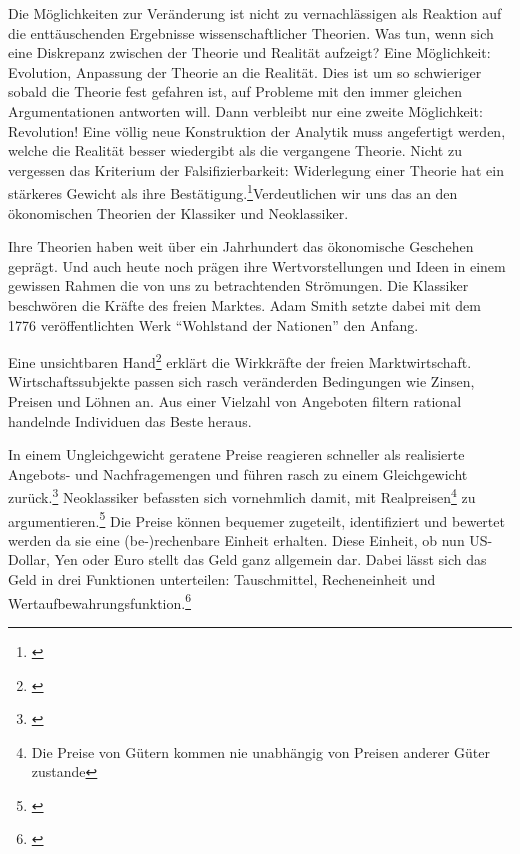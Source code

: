 \documentclass[
        onecolumn,
        a4paper,
        abstracton,
        parskip=half
        ,final
        ]{scrartcl}
\begin{document}
Die M{\"o}glichkeiten zur Ver{\"a}nderung ist nicht zu vernachl{\"a}ssigen als Reaktion auf die entt{\"a}uschenden Ergebnisse wissenschaftlicher Theorien. Was tun, wenn sich eine Diskrepanz zwischen der Theorie und Realit{\"a}t aufzeigt?
 Eine M{\"o}glichkeit: Evolution, Anpassung der Theorie an die Realit{\"a}t. Dies ist um so schwieriger sobald die Theorie fest gefahren ist, auf Probleme mit den immer gleichen Argumentationen antworten will. 
 Dann verbleibt nur eine zweite M{\"o}glichkeit: Revolution! Eine v{\"o}llig neue Konstruktion der Analytik muss angefertigt werden, welche die Realit{\"a}t besser wiedergibt als die vergangene Theorie. 
 Nicht zu vergessen das Kriterium der Falsifizierbarkeit: Widerlegung einer Theorie hat ein st{\"a}rkeres Gewicht als ihre Best{\"a}tigung.\footnote[11]{\citep*[S.161]{bombach1981theorie}}Verdeutlichen wir uns das an den {\"o}konomischen Theorien der Klassiker und Neoklassiker. 
     
Ihre Theorien haben weit {\"u}ber ein Jahrhundert das {\"o}konomische Geschehen gepr{\"a}gt. Und auch heute noch pr{\"a}gen ihre Wertvorstellungen und Ideen in einem gewissen Rahmen die von uns zu betrachtenden Str{\"o}mungen.
Die Klassiker beschw{\"o}ren die Kr{\"a}fte des freien Marktes.  Adam Smith setzte dabei mit dem 1776 ver{\"o}ffentlichten Werk "`Wohlstand der Nationen"' den Anfang.

Eine unsichtbaren Hand\footnote[12]{\citep*[S.137]{bombach1981theorie}} erkl{\"a}rt die Wirkkr{\"a}fte der freien Marktwirtschaft. Wirtschaftssubjekte passen sich rasch ver{\"a}nderden Bedingungen wie  Zinsen, Preisen und L{\"o}hnen an. Aus einer Vielzahl von Angeboten filtern rational handelnde Individuen das Beste heraus.

In einem Ungleichgewicht geratene Preise reagieren schneller als realisierte Angebots- und Nachfragemengen und f{\"u}hren rasch zu einem Gleichgewicht zur{\"u}ck.\footnote[13]{\citep*[S.291]{Basseler2010}} Neoklassiker befassten sich vornehmlich damit, mit Realpreisen\footnote[14]{Die Preise von G{\"u}tern kommen nie unabh{\"a}ngig von Preisen anderer G{\"u}ter zustande} zu argumentieren.\footnote[15]{\citep*[S.138]{bombach1981theorie}} Die Preise k{\"o}nnen bequemer zugeteilt, identifiziert und bewertet werden da sie eine (be-)rechenbare Einheit erhalten. Diese Einheit, ob nun US-Dollar, Yen oder Euro stellt das Geld ganz allgemein dar. Dabei l{\"a}sst sich das Geld in drei Funktionen unterteilen: Tauschmittel, Recheneinheit und Wertaufbewahrungsfunktion.\footnote[16]{\citep*[S.417]{Basseler2010}}
\end{document}
